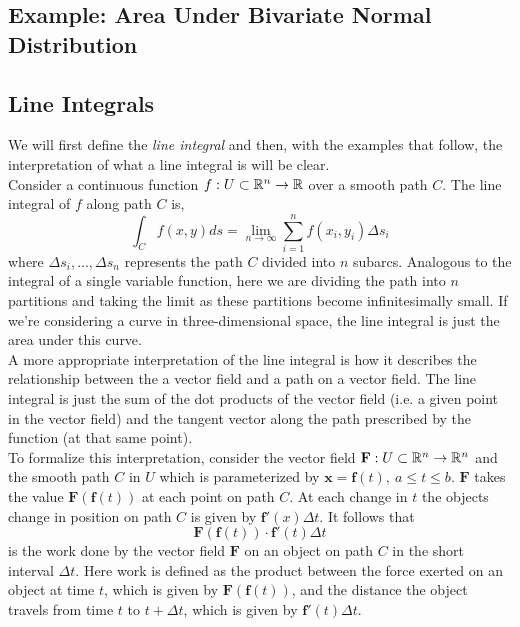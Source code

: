 \documentclass[12pt]{article}
\begin{document}
\subsection{Example: Area Under Bivariate Normal Distribution}

\subsection{Line Integrals}

 We will first define the \emph{line integral} and then, with the examples that follow, the interpretation of what a line integral is will be clear.  \\

 Consider a continuous function $f:U\subset\mathbb{R}^n\rightarrow\mathbb{R}$ over a smooth path $C$. The line integral of $f$ along path $C$ is,
\[
\int_C f(x,y) ds = \lim_{n\rightarrow\infty} \sum_{i=1}^n f(x_i,y_i) \Delta s_i
\]
where $\Delta s_i,\ldots,\Delta s_n$ represents the path $C$ divided into $n$ subarcs. Analogous to the integral of a single variable function, here we are dividing the path into $n$ partitions and taking the limit as these partitions become infinitesimally small. If we're considering a curve in three-dimensional space, the line integral is just the area under this curve. \\ 

 A more appropriate interpretation of the line integral is how it describes the relationship between the a vector field and a path on a vector field. The line integral is just the sum of the dot products of the vector field (i.e. a given point in the vector field) and the tangent vector along the path prescribed by the function (at that same point). \\

 To formalize this interpretation, consider the vector field $\mathbf{F}:U\subset\mathbb{R}^n\rightarrow\mathbb{R}^n$ and the smooth path $C$ in $U$ which is parameterized by $\mathbf{x}=\mathbf{f}(t),\ a\leq t\leq b$. $\mathbf{F}$ takes the value $\mathbf{F}(\mathbf{f}(t))$ at each point on path $C$. At each change in $t$ the objects change in position on path $C$ is given by $\mathbf{f}'(x)\Delta t$. It follows that 
\[
\mathbf{F}(\mathbf{f}(t)) \cdot \mathbf{f}'(t)\Delta t
\]
is the work done by the vector field $\mathbf{F}$ on an object on path $C$ in the short interval $\Delta t$. Here work is defined as the product between the force exerted on an object at time $t$, which is given by $\mathbf{F}(\mathbf{f}(t))$, and the distance the object travels from time $t$ to $t+\Delta t$, which is given by $\mathbf{f}'(t)\Delta t$.\\
\end{document}
